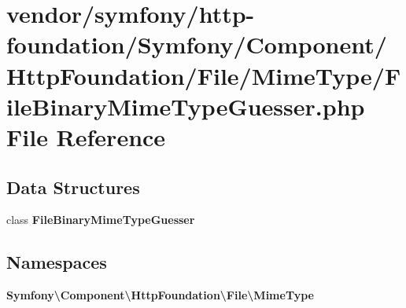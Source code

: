\section{vendor/symfony/http-\/foundation/\+Symfony/\+Component/\+Http\+Foundation/\+File/\+Mime\+Type/\+File\+Binary\+Mime\+Type\+Guesser.php File Reference}
\label{_file_binary_mime_type_guesser_8php}
\subsection*{Data Structures}
\begin{DoxyCompactItemize}
\item 
class {\bf File\+Binary\+Mime\+Type\+Guesser}
\end{DoxyCompactItemize}
\subsection*{Namespaces}
\begin{DoxyCompactItemize}
\item 
 {\bf Symfony\textbackslash{}\+Component\textbackslash{}\+Http\+Foundation\textbackslash{}\+File\textbackslash{}\+Mime\+Type}
\end{DoxyCompactItemize}

